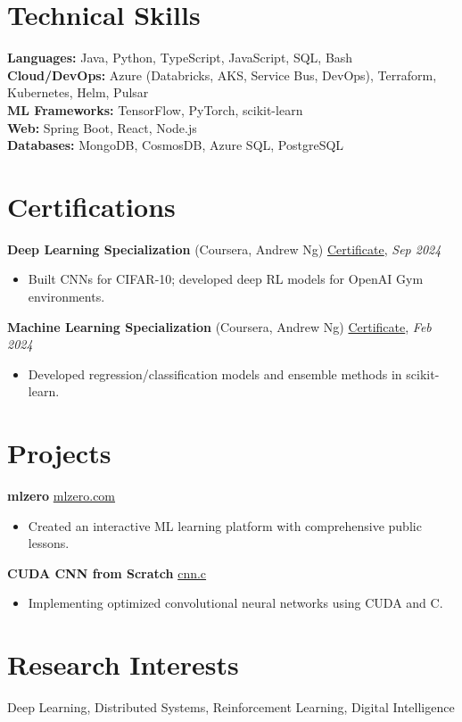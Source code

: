 \documentclass[10pt]{article}
\begin{document}
\section*{Technical Skills}
\textbf{Languages:} Java, Python, TypeScript, JavaScript, SQL, Bash\\
\textbf{Cloud/DevOps:} Azure (Databricks, AKS, Service Bus, DevOps), Terraform, Kubernetes, Helm, Pulsar\\
\textbf{ML Frameworks:} TensorFlow, PyTorch, scikit-learn\\
\textbf{Web:} Spring Boot, React, Node.js\\
\textbf{Databases:} MongoDB, CosmosDB, Azure SQL, PostgreSQL

\section*{Certifications}
\textbf{Deep Learning Specialization} (Coursera, Andrew Ng) \hfill \href{https://coursera.org/share/f5fa4c831a360de7841411165ebabcc4}{Certificate}, \textit{Sep 2024}
\begin{itemize}[leftmargin=0.25in, itemsep=0pt]
    \item Built CNNs for CIFAR-10; developed deep RL models for OpenAI Gym environments.
\end{itemize}
\textbf{Machine Learning Specialization} (Coursera, Andrew Ng) \hfill \href{https://coursera.org/share/c8ccd34bd3358236ad3f17c5907bdf17}{Certificate}, \textit{Feb 2024}
\begin{itemize}[leftmargin=0.25in, itemsep=0pt]
    \item Developed regression/classification models and ensemble methods in scikit-learn.
\end{itemize}

\section*{Projects}
\textbf{mlzero} \hfill \href{https://mlzero.com}{mlzero.com}
\begin{itemize}[leftmargin=0.25in, itemsep=0pt]
    \item Created an interactive ML learning platform with comprehensive public lessons.
\end{itemize}
\textbf{CUDA CNN from Scratch} \hfill \href{https://cnn.c}{cnn.c}
\begin{itemize}[leftmargin=0.25in, itemsep=0pt]
    \item Implementing optimized convolutional neural networks using CUDA and C.
\end{itemize}

\section*{Research Interests}
Deep Learning, Distributed Systems, Reinforcement Learning, Digital Intelligence
\end{document}
